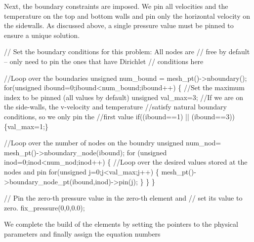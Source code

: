 Next, the boundary constraints are imposed. We pin all velocities and the temperature on the top and bottom walls and pin only the horizontal velocity on the sidewalls. As discussed above, a single pressure value must be pinned to ensure a unique solution.


\begin{DoxyCodeInclude}
 \textcolor{comment}{// Set the boundary conditions for this problem: All nodes are}
 \textcolor{comment}{// free by default -- only need to pin the ones that have Dirichlet }
 \textcolor{comment}{// conditions here}

 \textcolor{comment}{//Loop over the boundaries}
 \textcolor{keywordtype}{unsigned} num\_bound = mesh\_pt()->nboundary();
 \textcolor{keywordflow}{for}(\textcolor{keywordtype}{unsigned} ibound=0;ibound<num\_bound;ibound++)
  \{
   \textcolor{comment}{//Set the maximum index to be pinned (all values by default)}
   \textcolor{keywordtype}{unsigned} val\_max=3;
   \textcolor{comment}{//If we are on the side-walls, the v-velocity and temperature}
   \textcolor{comment}{//satisfy natural boundary conditions, so we only pin the}
   \textcolor{comment}{//first value}
   \textcolor{keywordflow}{if}((ibound==1) || (ibound==3)) \{val\_max=1;\}

   \textcolor{comment}{//Loop over the number of nodes on the boundry}
   \textcolor{keywordtype}{unsigned} num\_nod= mesh\_pt()->nboundary\_node(ibound);
   \textcolor{keywordflow}{for} (\textcolor{keywordtype}{unsigned} inod=0;inod<num\_nod;inod++)
    \{
     \textcolor{comment}{//Loop over the desired values stored at the nodes and pin}
     \textcolor{keywordflow}{for}(\textcolor{keywordtype}{unsigned} j=0;j<val\_max;j++)
      \{
       mesh\_pt()->boundary\_node\_pt(ibound,inod)->pin(j);
      \}
    \}
  \}
 
 \textcolor{comment}{// Pin the zero-th pressure value in the zero-th element and}
 \textcolor{comment}{// set its value to zero.}
 fix\_pressure(0,0,0.0);

\end{DoxyCodeInclude}


We complete the build of the elements by setting the pointers to the physical parameters and finally assign the equation numbers


